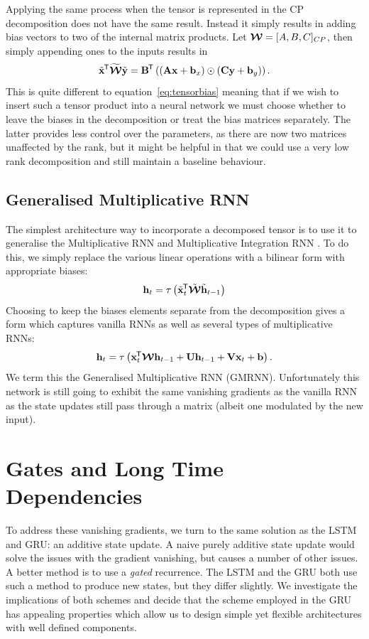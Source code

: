 Applying the same process when the tensor is represented in the CP decomposition does not
have the same result. Instead it simply results in adding bias vectors to two of the internal
matrix products. Let \(\bm{\mathcal{W}} = [A, B, C]_{CP}\), then simply appending ones to the inputs
results in
\begin{equation}
	\tilde{\mathbf{x}}^{\mkern-1.5mu\mathsf{T}}\widetilde{\bm{\mathcal{W}}}\tilde{\mathbf{y}}
	= \mathbf{B}^{\mkern-1.5mu\mathsf{T}}\left( (\mathbf{A}\mathbf{x} + \mathbf{b}_x) \odot (\mathbf{C}\mathbf{y} + \mathbf{b}_y)\right).
\end{equation} This is quite different to equation~\eqref{eq:tensorbias} meaning that if we wish to
insert such a tensor product into a neural network we must choose whether to leave the biases in
the decomposition or treat the bias matrices separately. The latter provides less control over the
parameters, as there are now two matrices unaffected by the rank, but it might be helpful in that we
could use a very low rank decomposition and still maintain a baseline behaviour.

\subsection{Generalised Multiplicative RNN}\label{sec:gmrnn}
The simplest architecture way to incorporate a decomposed tensor is to use it to generalise the
Multiplicative RNN and Multiplicative Integration RNN \autocite{Martens2011a, Wu2016}.
To do this, we simply replace the various linear operations with a bilinear form with appropriate
biases:
\begin{equation}\label{eq:gmrnn}
	\mathbf{h}_t = \tau\left( \tilde{\mathbf{x}}_t^{\mkern-1.5mu\mathsf{T}}\tilde{\bm{\mathcal{W}}}\tilde{\mathbf{h}}_{t-1} \right)
\end{equation}
Choosing to keep the biases elements separate from the decomposition gives a form which captures
vanilla RNNs as well as several types of multiplicative RNNs:
\begin{equation}\label{eq:gmrnnbias}
	\mathbf{h}_t = \tau\left(\mathbf{x}_t^{\mkern-1.5mu\mathsf{T}}\bm{\mathcal{W}}\mathbf{h}_{t-1}
		+ \mathbf{U}\mathbf{h}_{t-1} + \mathbf{V}\mathbf{x}_t + \mathbf{b}\right).
\end{equation} We term this the Generalised Multiplicative RNN (GMRNN). Unfortunately this
network is still going to exhibit the same vanishing gradients as the vanilla RNN as the state updates
still pass through a matrix (albeit one modulated by the new input).

\section{Gates and Long Time Dependencies}
To address these vanishing gradients, we turn to the same solution as the LSTM and GRU: an additive state
update. A naive purely additive state update would solve the issues with the gradient vanishing, but
causes a number of other issues. A better method is to use a \emph{gated} recurrence. The LSTM and
the GRU both use such a method to produce new states, but they differ slightly. We investigate
the implications of both schemes and decide that the scheme employed in the GRU has appealing 
properties which allow us to design simple yet flexible architectures with well defined components.

